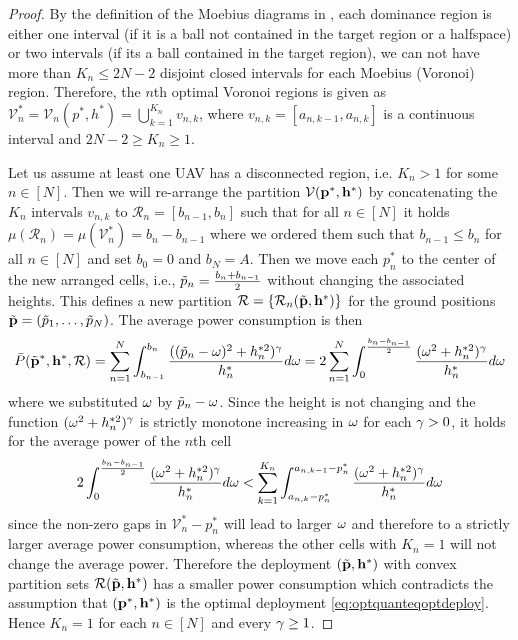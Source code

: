 \documentclass[smallabstract,smallcaptions]{dccpaper}
\newcommand{\Pbar}{\ensuremath{\bar{P}}}         %
\newcommand{\Vor}{\ensuremath{\mathcal{V}}}         %
\newcommand{\Rset}{\ensuremath{\mathcal R}}
\begin{document}
\begin{proof}
  By the definition of the
  Moebius diagrams in , each dominance region is either one interval (if it is a ball not contained
  in the target region or a halfspace) or two intervals (if its a ball contained in the target region), we can not have
  more than $K_n\leq 2N-2$ disjoint closed intervals for each Moebius (Voronoi) region.  Therefore, the $n$th optimal
  Voronoi regions is given as $\Vor^*_n=\Vor_n(p^*, h^*)=\bigcup_{k=1}^{K_n}v_{n,k}$, where $v_{n,k}=[a_{n,k-1},a_{n,k}]$
  is a continuous interval and $2N-2\geq K_n\geq 1$.

  Let us assume at least one UAV has a disconnected region, i.e. $K_n>1$ for some $n\in[N]$. Then we will re-arrange the
  partition $\Vor(\vp^*,\vh^*)$ by concatenating the $K_n$ intervals $v_{n,k}$ to $\Rset_n=[b_{n-1},b_{n}]$ such that for
  all $n\in[N]$ it holds $\mu(\Rset_n)=\mu(\Vor^*_n)=b_n-b_{n-1}$ where we ordered them such that $b_{n-1}\leq b_{n}$ for all $n\in[N]$
  and set $b_0=0$ and $b_N=A$. Then we move each $p_n^*$ to the center of the new arranged cells, i.e.,
  $\tilde{p}_n=\frac{b_n+b_{n-1}}{2}$ without changing the associated heights. This defines a new partition
  $\Rset=\{\Rset_n(\tvp,\vh^*)\}$ for the ground positions $\tilde{{\mathbf p}}=(\tilde{p}_1,\dots,\tilde{p}_N)$. The average power consumption is then
  \begin{align}
    \Pbar(\tvp^*,\vh^*,\Rset)=\sum_{n=1}^N \int_{b_{n-1}}^{b_n} \frac{ ((\tp_n-\ome)^2+h_n^{*2})^{\gam}}{h_n^{*}} d\ome
= 2\sum_{n=1}^N \int_{0}^{\frac{b_n-b_{n-1}}{2}} \frac{ (\ome^2+h_n^{*2})^{\gam}}{h_n^{*}} d\ome
  \end{align}
  where we substituted $\omega$ by $\tilde{p}_n-\omega$. Since the height is not changing and the function
  $(\omega^2+h_n^{*2})^{\gamma}$ is strictly monotone increasing in $\omega$ for each $\gamma>0$, it holds for the average power
  of the $n$th cell 
  \begin{align}
    2\int_{0}^{\frac{b_n-b_{n-1}}{2}} \frac{ (\omega^2+h_n^{*2})^{\gamma}}{h_n^{*}} d\omega 
    < \sum_{k=1}^{K_n}\int_{a_{n,k}-p_n^*}^{a_{n,k-1}-p_n^*} \frac{ (\omega^2+h_n^{*2})^{\gamma}}{h_n^{*}} d\omega
  \end{align}
  since the non-zero gaps in $\Vor_n^*-p_n^*$ will lead to larger $\omega$ and therefore to a strictly larger average
  power consumption, whereas the other cells with $K_n=1$ will not change the average power.  Therefore the deployment
  $(\tilde{{\mathbf p}},{\mathbf h}^*)$ with convex partition sets  $\Rset(\tvp,\vh^*)$ has a smaller power consumption which contradicts 
  the assumption that $({\mathbf p}^*,{\mathbf h}^*)$ is the optimal deployment \eqref{eq:optquanteqoptdeploy}. Hence $K_n=1$ for each
  $n\in[N]$ and every $\gamma\geq 1$.



\end{proof}
\end{document}
